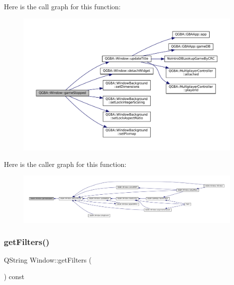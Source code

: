 Here is the call graph for this function\+:
\nopagebreak
\begin{figure}[H]
\begin{center}
\leavevmode
\includegraphics[width=350pt]{class_q_g_b_a_1_1_window_a1dc3c78cd77d281e0604f69da146f33a_cgraph}
\end{center}
\end{figure}
Here is the caller graph for this function\+:
\nopagebreak
\begin{figure}[H]
\begin{center}
\leavevmode
\includegraphics[width=350pt]{class_q_g_b_a_1_1_window_a1dc3c78cd77d281e0604f69da146f33a_icgraph}
\end{center}
\end{figure}
\mbox{\label{class_q_g_b_a_1_1_window_a6deb2c5ee22e8538d5ca27be1a342a05}} 
\subsubsection{\texorpdfstring{get\+Filters()}{getFilters()}}
{\footnotesize\ttfamily Q\+String Window\+::get\+Filters (\begin{DoxyParamCaption}{ }\end{DoxyParamCaption}) const\hspace{0.3cm}{\ttfamily [private]}}

